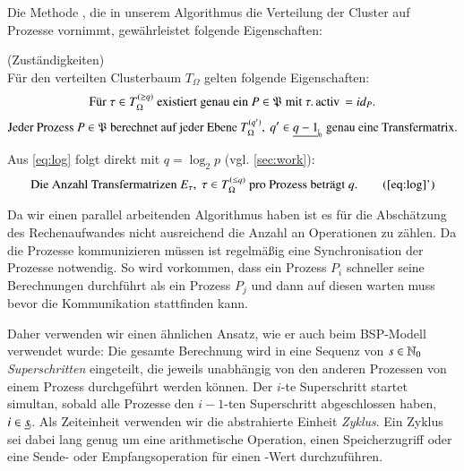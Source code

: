   Die Methode , die in unserem Algorithmus die Verteilung der Cluster auf Prozesse vornimmt, gewährleistet folgende Eigenschaften:
  
  \begin{bem}
    (Zuständigkeiten)\\
    Für den verteilten Clusterbaum $T_\Omega$ gelten folgende Eigenschaften:
    \begin{equation}
      \text{Für } \tau \in T_\Omega^{(\geq q)} \text{ existiert genau ein } P \in \Proc \text{ mit } \tau.\tcode{activ} = id_P.
    \end{equation}
    \begin{equation}
      \text{Jeder Prozess } P \in \Proc \text{ berechnet auf jeder Ebene } T_\Omega^{(q')}, \ q' \in \nullhaken{q-1} \text{ genau eine Transfermatrix.}\label{eq:log}
    \end{equation}

    Aus \autoref{eq:log} folgt direkt mit $q = \log_2 p$ (vgl. \autoref{sec:work}):
    \begin{equation}
      \text{Die Anzahl Transfermatrizen } E_\tau, \ \tau \in T_\Omega^{(\leq q)} \text{ pro Prozess beträgt } q.\tag{\ref{eq:log}'}
    \end{equation}
  \end{bem}

  Da wir einen parallel arbeitenden Algorithmus haben ist es für die Abschätzung des Rechenaufwandes nicht ausreichend die Anzahl an Operationen zu zählen. Da die Prozesse kommunizieren müssen ist 
  regelmäßig eine Synchronisation der Prozesse notwendig. So wird vorkommen, dass ein Prozess $P_i$ schneller seine Berechnungen durchführt als ein Prozess $P_j$ und dann auf diesen warten muss bevor
  die Kommunikation stattfinden kann. 
  
  Daher verwenden wir einen ähnlichen Ansatz, wie er auch beim BSP-Modell \citep{bsp} verwendet wurde: Die gesamte Berechnung wird in eine Sequenz von $s \in \mathbb{N}_0$ \textit{Superschritten} eingeteilt,
  die jeweils unabhängig von den anderen Prozessen von einem Prozess durchgeführt werden können. Der $i$-te Superschritt startet simultan, sobald alle Prozesse den $i-1$-ten Superschritt abgeschlossen
  haben, $i \in \haken{s}$. Als Zeiteinheit verwenden wir die abstrahierte Einheit \textit{Zyklus}. Ein Zyklus sei dabei lang genug um eine arithmetische Operation, einen Speicherzugriff oder eine Sende-
  oder Empfangsoperation für einen -Wert durchzuführen.
  

